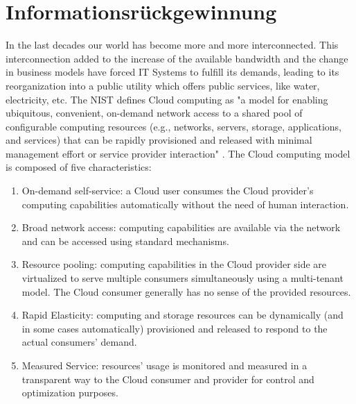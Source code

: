 \section{Informationsrückgewinnung}
\label{sec:Informationsrückgewinnung}

In the last decades our world has become more and more interconnected. This interconnection added to the increase of the available bandwidth and the change in business models have forced IT Systems to fulfill its demands, leading to its reorganization into a public utility which offers public services, like water, electricity, etc. The \ac{NIST} defines Cloud computing as "a model for enabling ubiquitous, convenient, on-demand network access to a shared pool of configurable computing resources (e.g., networks, servers, storage, applications, and services) that can be rapidly provisioned and released with minimal management effort or service provider interaction"  \cite{NIST2011}. The Cloud computing model is composed of five characteristics:
	\begin{enumerate}
		\item On-demand self-service: a Cloud user consumes the Cloud provider's computing capabilities automatically without the need of human interaction. 
		\item Broad network access: computing capabilities are available via the network and can be accessed using standard mechanisms.
		\item Resource pooling: computing capabilities in the Cloud provider side are virtualized to serve multiple consumers simultaneously using a multi-tenant model. The Cloud consumer generally has no sense of the provided resources.
		\item Rapid Elasticity: computing and storage resources can be dynamically (and in some cases automatically) provisioned and released to respond to the actual consumers' demand.
		\item Measured Service: resources' usage is monitored and measured in a transparent way to the Cloud consumer and provider for control and optimization purposes.
	\end{enumerate}

